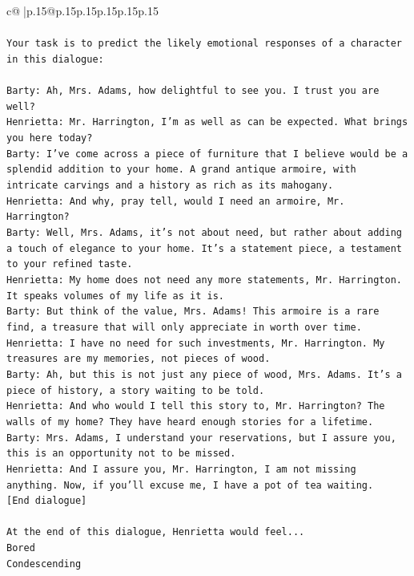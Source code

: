 \documentclass{article}
\begin{document}
{\begin{supertabular}{c@{$\;$}|p{.15\linewidth}@{}p{.15\linewidth}p{.15\linewidth}p{.15\linewidth}p{.15\linewidth}p{.15\linewidth}}
{{{\\ 
\\ 
\texttt{Your task is to predict the likely emotional responses of a character in this dialogue:} \\
\\ 
\texttt{Barty: Ah, Mrs. Adams, how delightful to see you. I trust you are well?} \\
\texttt{Henrietta: Mr. Harrington, I'm as well as can be expected. What brings you here today?} \\
\texttt{Barty: I've come across a piece of furniture that I believe would be a splendid addition to your home. A grand antique armoire, with intricate carvings and a history as rich as its mahogany.} \\
\texttt{Henrietta: And why, pray tell, would I need an armoire, Mr. Harrington?} \\
\texttt{Barty: Well, Mrs. Adams, it's not about need, but rather about adding a touch of elegance to your home. It's a statement piece, a testament to your refined taste.} \\
\texttt{Henrietta: My home does not need any more statements, Mr. Harrington. It speaks volumes of my life as it is.} \\
\texttt{Barty: But think of the value, Mrs. Adams! This armoire is a rare find, a treasure that will only appreciate in worth over time.} \\
\texttt{Henrietta: I have no need for such investments, Mr. Harrington. My treasures are my memories, not pieces of wood.} \\
\texttt{Barty: Ah, but this is not just any piece of wood, Mrs. Adams. It's a piece of history, a story waiting to be told.} \\
\texttt{Henrietta: And who would I tell this story to, Mr. Harrington? The walls of my home? They have heard enough stories for a lifetime.} \\
\texttt{Barty: Mrs. Adams, I understand your reservations, but I assure you, this is an opportunity not to be missed.} \\
\texttt{Henrietta: And I assure you, Mr. Harrington, I am not missing anything. Now, if you'll excuse me, I have a pot of tea waiting.} \\
\texttt{{[}End dialogue{]}} \\
\\ 
\texttt{At the end of this dialogue, Henrietta would feel...} \\
\texttt{Bored} \\
\texttt{Condescending} \\
}}}
\end{supertabular}}
\end{document}
